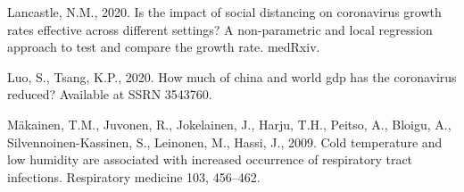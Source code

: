 \documentclass[]{elsarticle} %
\begin{document}
\leavevmode\hypertarget{ref-Lancastle2020impact}{}%
Lancastle, N.M., 2020. Is the impact of social distancing on coronavirus
growth rates effective across different settings? A non-parametric and
local regression approach to test and compare the growth rate. medRxiv.

\leavevmode\hypertarget{ref-Luo2020how}{}%
Luo, S., Tsang, K.P., 2020. How much of china and world gdp has the
coronavirus reduced? Available at SSRN 3543760.

\leavevmode\hypertarget{ref-Makinen2009cold}{}%
Mäkainen, T.M., Juvonen, R., Jokelainen, J., Harju, T.H., Peitso, A.,
Bloigu, A., Silvennoinen-Kassinen, S., Leinonen, M., Hassi, J., 2009.
Cold temperature and low humidity are associated with increased
occurrence of respiratory tract infections. Respiratory medicine 103,
456--462.
\end{document}
